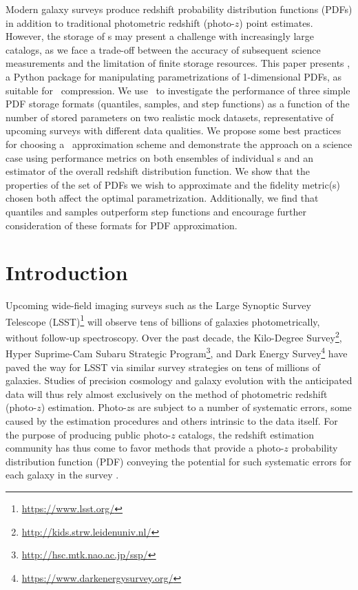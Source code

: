 Modern galaxy surveys produce redshift probability distribution functions 
(PDFs) in addition to traditional photometric redshift (photo-$z$) point 
estimates.
However, the storage of \pz s may present a challenge with increasingly large 
catalogs, as we face a trade-off between the accuracy of subsequent science 
measurements and the limitation of finite storage resources.
This paper presents \qp, a Python package for manipulating parametrizations of 
1-dimensional PDFs, as suitable for \pz\ compression.
We use \qp\ to investigate the performance of three simple PDF storage formats 
(quantiles, samples, and step functions) as a function of the number of stored 
parameters on two realistic mock datasets, representative of upcoming surveys 
with different data qualities.
We propose some best practices for choosing a \pz\ approximation scheme and 
demonstrate the approach on a science case using performance metrics on both 
ensembles of individual \pz s and an estimator of the overall redshift 
distribution function.
We show that the properties of the set of PDFs we wish to approximate and the 
fidelity metric(s) chosen both affect the optimal parametrization.
Additionally, we find that quantiles and samples outperform step functions and 
encourage further consideration of these formats for PDF approximation.

\section{Introduction}


Upcoming wide-field imaging surveys such as the Large Synoptic Survey Telescope 
(LSST)\footnote{\url{https://www.lsst.org/}}\citep{ivezic_lsst:_2008} will 
observe tens of billions of galaxies photometrically, without follow-up 
spectroscopy.
Over the past decade, the Kilo-Degree 
Survey\footnote{\url{http://kids.strw.leidenuniv.nl/}}, Hyper Suprime-Cam 
Subaru Strategic Program\footnote{\url{http://hsc.mtk.nao.ac.jp/ssp/}}, and 
Dark Energy Survey\footnote{\url{https://www.darkenergysurvey.org/}} have paved 
the way for LSST via similar survey strategies on tens of millions of galaxies.
Studies of precision cosmology and galaxy evolution with the anticipated data 
will thus rely almost exclusively on the method of photometric redshift 
(photo-$z$) estimation.
Photo-$z$s are subject to a number of systematic errors, some caused by the 
estimation procedures and others intrinsic to the data itself.
For the purpose of producing public photo-$z$ catalogs, the redshift estimation 
community has thus come to favor methods that provide a photo-$z$ probability 
distribution function (PDF) conveying the potential for such systematic errors 
for each galaxy in the survey \citep{tanaka_photometric_2017, 
	de_jong_third_2017, sheldon_photometric_2012}.

